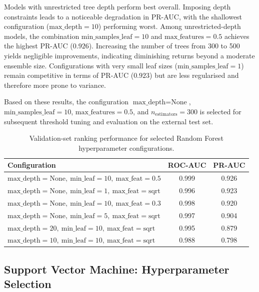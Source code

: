 \documentclass[oneside,12pt,parskip=half,american,numbers=noenddot]{scrreprt}
\begin{document}
Models with unrestricted tree depth perform best overall. Imposing depth constraints leads to a noticeable degradation in PR-AUC, with the shallowest configuration ($\text{max\_depth}=10$) performing worst. Among unrestricted-depth models, the combination $\text{min\_samples\_leaf}=10$ and $\text{max\_features}=0.5$ achieves the highest PR-AUC ($0.926$). Increasing the number of trees from 300 to 500 yields negligible improvements, indicating diminishing returns beyond a moderate ensemble size. Configurations with very small leaf sizes ($\text{min\_samples\_leaf}=1$) remain competitive in terms of PR-AUC ($0.923$) but are less regularised and therefore more prone to variance.

Based on these results, the configuration $\text{max\_depth}=\text{None}$, $\text{min\_samples\_leaf}=10$, $\text{max\_features}=0.5$, and $n_{\text{estimators}}=300$ is selected for subsequent threshold tuning and evaluation on the external test set.


\begin{table}[H]
\centering
\caption{Validation-set ranking performance for selected Random Forest hyperparameter configurations.}
\label{tab:rf_grid_results}
\small
\renewcommand{\arraystretch}{1.2}
\begin{tabular}{lcc}
\hline
\textbf{Configuration} & \textbf{ROC-AUC} & \textbf{PR-AUC} \\
\hline
$\text{max\_depth}=\text{None},\ \text{min\_leaf}=10,\ \text{max\_feat}=0.5$ & 0.999 & 0.926 \\
$\text{max\_depth}=\text{None},\ \text{min\_leaf}=1,\ \text{max\_feat}=\text{sqrt}$ & 0.996 & 0.923 \\
$\text{max\_depth}=\text{None},\ \text{min\_leaf}=10,\ \text{max\_feat}=0.3$ & 0.998 & 0.920 \\
$\text{max\_depth}=\text{None},\ \text{min\_leaf}=5,\ \text{max\_feat}=\text{sqrt}$ & 0.997 & 0.904 \\
$\text{max\_depth}=20,\ \text{min\_leaf}=10,\ \text{max\_feat}=\text{sqrt}$ & 0.995 & 0.879 \\
$\text{max\_depth}=10,\ \text{min\_leaf}=10,\ \text{max\_feat}=\text{sqrt}$ & 0.988 & 0.798 \\
\hline
\end{tabular}
\end{table}


\subsection{Support Vector Machine: Hyperparameter Selection}
\end{document}
